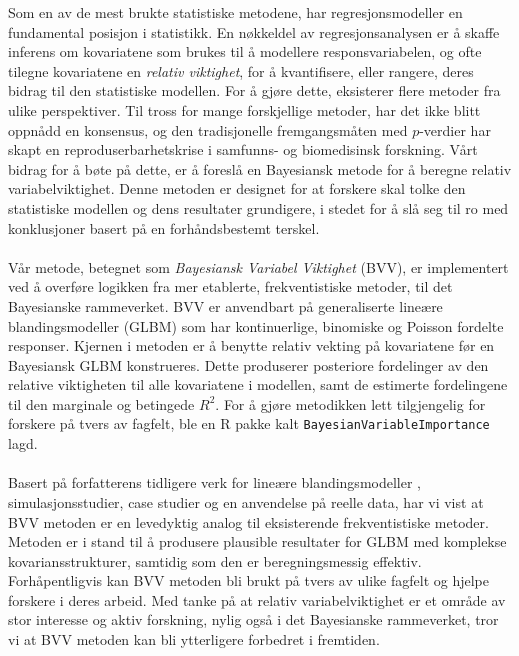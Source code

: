 Som en av de mest brukte statistiske metodene, har regresjonsmodeller en fundamental posisjon i statistikk. En nøkkeldel av regresjonsanalysen er å skaffe inferens om kovariatene som brukes til å modellere responsvariabelen, og ofte tilegne kovariatene en \textit{relativ viktighet}, for å kvantifisere, eller rangere, deres bidrag til den statistiske modellen. For å gjøre dette, eksisterer flere metoder fra ulike perspektiver. Til tross for mange forskjellige metoder, har det ikke blitt oppnådd en konsensus, og den tradisjonelle fremgangsmåten med $p$-verdier har skapt en reproduserbarhetskrise i samfunns- og biomedisinsk forskning. Vårt bidrag for å bøte på dette, er å foreslå en Bayesiansk metode for å beregne relativ variabelviktighet. Denne metoden er designet for at forskere skal tolke den statistiske modellen og dens resultater grundigere, i stedet for å slå seg til ro med konklusjoner basert på en forhåndsbestemt terskel.
\\
\\
Vår metode, betegnet som \textit{Bayesiansk Variabel Viktighet} (BVV), er implementert ved å overføre logikken fra mer etablerte, frekventistiske metoder, til det Bayesianske rammeverket. BVV er anvendbart på generaliserte lineære blandingsmodeller (GLBM) som har kontinuerlige, binomiske og Poisson fordelte responser. Kjernen i metoden er å benytte relativ vekting på kovariatene før en Bayesiansk GLBM konstrueres. Dette produserer posteriore fordelinger av den relative viktigheten til alle kovariatene i modellen, samt de estimerte fordelingene til den marginale og betingede $R^2$. For å gjøre metodikken lett tilgjengelig for forskere på tvers av fagfelt, ble en R pakke kalt \texttt{BayesianVariableImportance} lagd.
\\
\\
Basert på forfatterens tidligere verk for lineære blandingsmodeller \citep{Arnstad:Relative_variable_importance_in_Bayesian_linear_mixed_models:2024}, simulasjonsstudier, case studier og en anvendelse på reelle data, har vi vist at BVV metoden er en levedyktig analog til eksisterende frekventistiske metoder. Metoden er i stand til å produsere plausible resultater for GLBM med komplekse kovariansstrukturer, samtidig som den er beregningsmessig effektiv. Forhåpentligvis kan BVV metoden bli brukt på tvers av ulike fagfelt og hjelpe forskere i deres arbeid. Med tanke på at relativ variabelviktighet er et område av stor interesse og aktiv forskning, nylig også i det Bayesianske rammeverket, tror vi at BVV metoden kan bli ytterligere forbedret i fremtiden.